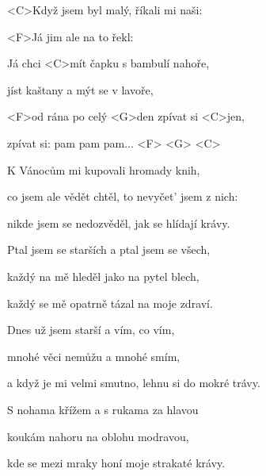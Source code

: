 

\zs
<C>Když jsem byl malý, říkali mi naši:


<F>Já jim ale na to řekl: 
\ks

\zr
Já chci <C>mít čapku s bambulí nahoře,

jíst kaštany a mýt se v lavoře,

<F>od rána po celý <G>den zpívat si <C>jen,

zpívat si: pam pam pam... <F> <G> <C>
\kr

\zs
K Vánocům mi kupovali hromady knih,

co jsem ale vědět chtěl, to nevyčet' jsem z nich:

nikde jsem se nedozvěděl, jak se hlídají krávy.

Ptal jsem se starších a ptal jsem se všech,

každý na mě hleděl jako na pytel blech,

každý se mě opatrně tázal na moje zdraví.
\ks

\zr \kr

\zs
Dnes už jsem starší a vím, co vím,

mnohé věci nemůžu a mnohé smím,

a když je mi velmi smutno, lehnu si do mokré trávy.

S nohama křížem a s rukama za hlavou

koukám nahoru na oblohu modravou,

kde se mezi mraky honí moje strakaté krávy.
\ks

\zr \kr

\kp







